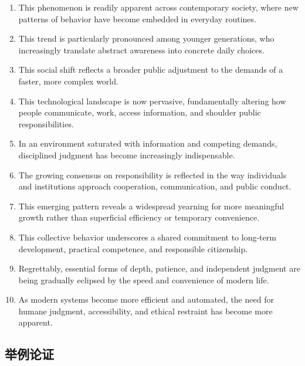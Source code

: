\begin{enumerate}
\item This phenomenon is readily apparent across contemporary society, where new patterns of behavior have become embedded in everyday routines.
\item This trend is particularly pronounced among younger generations, who increasingly translate abstract awareness into concrete daily choices.
\item This social shift reflects a broader public adjustment to the demands of a faster, more complex world.
\item This technological landscape is now pervasive, fundamentally altering how people communicate, work, access information, and shoulder public responsibilities.
\item In an environment saturated with information and competing demands, disciplined judgment has become increasingly indispensable.
\item The growing consensus on responsibility is reflected in the way individuals and institutions approach cooperation, communication, and public conduct.
\item This emerging pattern reveals a widespread yearning for more meaningful growth rather than superficial efficiency or temporary convenience.
\item This collective behavior underscores a shared commitment to long-term development, practical competence, and responsible citizenship.
\item Regrettably, essential forms of depth, patience, and independent judgment are being gradually eclipsed by the speed and convenience of modern life.
\item As modern systems become more efficient and automated, the need for humane judgment, accessibility, and ethical restraint has become more apparent.
\end{enumerate}

\subsection{举例论证}

